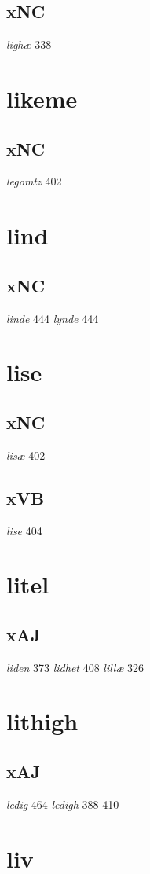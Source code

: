 \documentclass[a4paper,twocolumn]{article}
\begin{document}
\subsection{xNC}
\label{sec:org103c442}
\emph{lighæ} 338 
\section{likeme}
\label{sec:org3c782b9}
\subsection{xNC}
\label{sec:org611da42}
\emph{legomtz} 402 
\section{lind}
\label{sec:org8ff3b9e}
\subsection{xNC}
\label{sec:org31ca0e2}
\emph{linde} 444 \emph{lynde} 444 
\section{lise}
\label{sec:orgf35f9d4}
\subsection{xNC}
\label{sec:org87a639e}
\emph{lisæ} 402 
\subsection{xVB}
\label{sec:org13d7cec}
\emph{lise} 404 
\section{litel}
\label{sec:org447da44}
\subsection{xAJ}
\label{sec:org96905f7}
\emph{liden} 373 \emph{lidhet} 408 \emph{lillæ} 326 
\section{lithigh}
\label{sec:orga974887}
\subsection{xAJ}
\label{sec:org509da84}
\emph{ledig} 464 \emph{ledigh} 388 410 
\section{liv}
\label{sec:orgadead3d}
\end{document}
